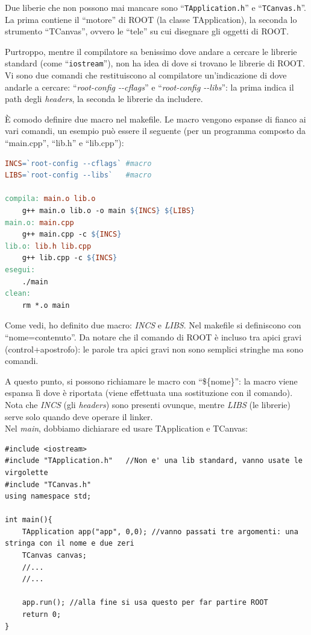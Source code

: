 Due liberie che non possono mai mancare sono ``\verb|TApplication.h|'' e ``\verb|TCanvas.h|''. La prima contiene il ``motore'' di ROOT (la classe TApplication), la seconda lo strumento ``TCanvas'', ovvero le ``tele'' su cui disegnare gli oggetti di ROOT.

Purtroppo, mentre il compilatore sa benissimo dove andare a cercare le librerie standard (come ``\verb|iostream|''), non ha idea di dove si trovano le librerie di ROOT. Vi sono due comandi che restituiscono al compilatore un'indicazione di dove andarle a cercare: ``\emph{root-config -{}-cflags}'' e ``\emph{root-config -{}-libs}'': la prima indica il path degli \emph{headers}, la seconda le librerie da includere. 

È comodo definire due macro nel makefile. Le macro vengono espanse di fianco ai vari comandi, un esempio può essere il seguente (per un programma composto da ``main.cpp'', ``lib.h'' e ``lib.cpp''):
\begin{lstlisting}[language=make]
INCS=`root-config --cflags` #macro
LIBS=`root-config --libs`   #macro

compila: main.o lib.o
	g++ main.o lib.o -o main ${INCS} ${LIBS}
main.o: main.cpp
	g++ main.cpp -c ${INCS}
lib.o: lib.h lib.cpp
	g++ lib.cpp -c ${INCS}
esegui:
	./main
clean:
	rm *.o main
\end{lstlisting}

Come vedi, ho definito due macro: \emph{INCS} e \emph{LIBS}. Nel makefile si definiscono con ``nome=contenuto''. Da notare che il comando di ROOT è incluso tra apici gravi (control+apostrofo): le parole tra apici gravi non sono semplici stringhe ma sono comandi.

A questo punto, si possono richiamare le macro con ``\$\{nome\}'': la macro viene espansa lì dove è riportata (viene effettuata una sostituzione con il comando). Nota che  \emph{INCS} (gli \emph{headers}) sono presenti ovunque, mentre \emph{LIBS} (le librerie) serve solo quando deve operare il linker.\\

Nel \emph{main}, dobbiamo dichiarare ed usare TApplication e TCanvas:
\begin{lstlisting}
#include <iostream>
#include "TApplication.h"	//Non e' una lib standard, vanno usate le virgolette
#include "TCanvas.h" 
using namespace std;

int main(){
	TApplication app("app", 0,0); //vanno passati tre argomenti: una stringa con il nome e due zeri
	TCanvas canvas;
	//...
	//...
	
	app.run(); //alla fine si usa questo per far partire ROOT
	return 0;
}
\end{lstlisting}


